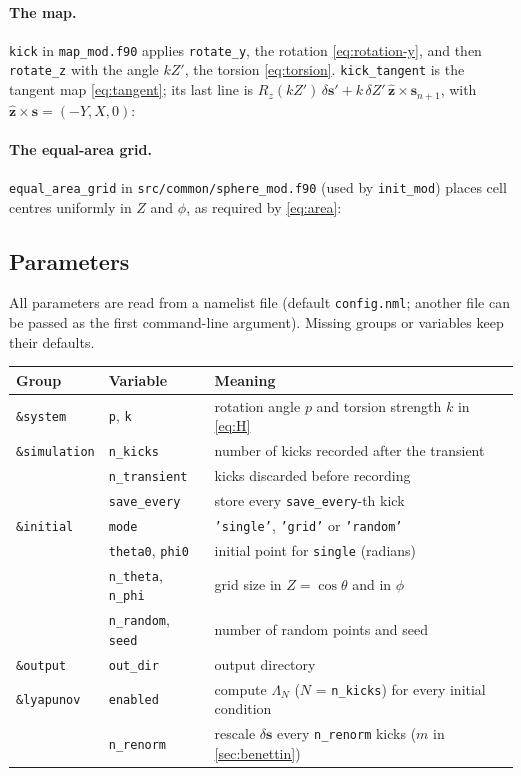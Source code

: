 \documentclass[11pt,a4paper]{article}
\newcommand{\vs}{\bm{s}}
\begin{document}
\paragraph{The map.} \texttt{kick} in \texttt{map\_mod.f90} applies \texttt{rotate\_y}, the rotation
\eqref{eq:rotation-y}, and then \texttt{rotate\_z} with the angle $kZ'$, the torsion \eqref{eq:torsion}.
\texttt{kick\_tangent} is the tangent map \eqref{eq:tangent}; its last line is $R_z(kZ')\,\delta\vs' + k\,\delta Z'\,
\hat{\bm z}\times\vs_{n+1}$, with $\hat{\bm z}\times\vs = (-Y, X, 0)$:


\paragraph{The equal-area grid.} \texttt{equal\_area\_grid} in \texttt{src/common/sphere\_mod.f90} (used by \texttt{init\_mod}) places cell centres uniformly in
$Z$ and $\phi$, as required by \eqref{eq:area}:


\subsection{Parameters}

All parameters are read from a namelist file (default \texttt{config.nml}; another file can be passed as the first
command-line argument). Missing groups or variables keep their defaults.
\begin{center}
\small
\begin{tabular}{lll}
  \toprule
  Group & Variable & Meaning \\
  \midrule
  \texttt{\&system} & \texttt{p}, \texttt{k} & rotation angle $p$ and torsion strength $k$ in \eqref{eq:H} \\
  \texttt{\&simulation} & \texttt{n\_kicks} & number of kicks recorded after the transient \\
   & \texttt{n\_transient} & kicks discarded before recording \\
   & \texttt{save\_every} & store every \texttt{save\_every}-th kick \\
  \texttt{\&initial} & \texttt{mode} & \texttt{'single'}, \texttt{'grid'} or \texttt{'random'} \\
   & \texttt{theta0}, \texttt{phi0} & initial point for \texttt{single} (radians) \\
   & \texttt{n\_theta}, \texttt{n\_phi} & grid size in $Z=\cos\theta$ and in $\phi$ \\
   & \texttt{n\_random}, \texttt{seed} & number of random points and seed \\
  \texttt{\&output} & \texttt{out\_dir} & output directory \\
  \texttt{\&lyapunov} & \texttt{enabled} & compute $\Lambda_N$ ($N$ = \texttt{n\_kicks}) for every initial condition \\
   & \texttt{n\_renorm} & rescale $\delta\vs$ every \texttt{n\_renorm} kicks ($m$ in \cref{sec:benettin}) \\
  \bottomrule
\end{tabular}
\end{center}
\end{document}
